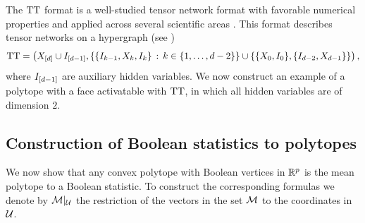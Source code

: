 The $\mathrm{TT}$ format is a well-studied tensor network format with favorable numerical properties \cite{holtz_manifolds_2012} and applied across several scientific areas \cite{sander_large-scale_2025}.
This format describes tensor networks on a hypergraph (see )
\begin{align*}
    \mathrm{TT}
    = \big(
    X_{[d]}\cup I_{[d-1]},
    \{\{I_{k-1},X_{k},I_{k}\}\,:\,k\in\{1,\ldots,d-2\}\}
    \cup\{\{X_{0},I_{0}\},\{I_{d-2},X_{d-1}\}\}
    \big) \, ,
\end{align*}
where $I_{[d-1]}$ are auxiliary hidden variables.
We now construct an example of a polytope with a face activatable with $\mathrm{TT}$, in which all hidden variables are of dimension $2$.



\subsection{Construction of Boolean statistics to polytopes}

We now show that any convex polytope with Boolean vertices in $\mathbb{R}^{p}$ is the mean polytope to a Boolean statistic.
To construct the corresponding formulas we denote by ${\mathcal{M}}|_{\mathcal{U}}$ the restriction of the vectors in the set $\mathcal{M}$ to the coordinates in $\mathcal{U}$.

